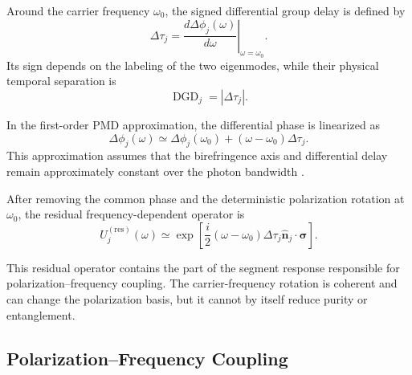 Around the carrier frequency \(\omega_0\), the signed differential group
delay is defined by
%
\begin{equation}
    \Delta\tau_j
    =
    \left.
    \frac{d\Delta\phi_j(\omega)}
    {d\omega}
    \right|_{\omega=\omega_0}.
    \label{eq:single_segment_signed_differential_group_delay}
\end{equation}
%
Its sign depends on the labeling of the two eigenmodes, while their physical
temporal separation is
%
\begin{equation}
    \operatorname{DGD}_j
    =
    |\Delta\tau_j|.
    \label{eq:single_segment_dgd}
\end{equation}

In the first-order PMD approximation, the differential phase is linearized
as
%
\begin{equation}
    \Delta\phi_j(\omega)
    \simeq
    \Delta\phi_j(\omega_0)
    +
    (\omega-\omega_0)\Delta\tau_j.
    \label{eq:single_segment_phase_linearization}
\end{equation}
%
This approximation assumes that the birefringence axis and differential
delay remain approximately constant over the photon bandwidth
\cite{gordon_kogelnik_pmd_2000}.

After removing the common phase and the deterministic polarization rotation
at \(\omega_0\), the residual frequency-dependent operator is
%
\begin{equation}
    U_j^{(\mathrm{res})}(\omega)
    \simeq
    \exp
    \left[
        \frac{i}{2}
        (\omega-\omega_0)
        \Delta\tau_j
        \widehat{\mathbf n}_j
        \cdot
        \boldsymbol{\sigma}
    \right].
    \label{eq:single_segment_residual_operator}
\end{equation}

This residual operator contains the part of the segment response responsible
for polarization--frequency coupling. The carrier-frequency rotation is
coherent and can change the polarization basis, but it cannot by itself
reduce purity or entanglement.


\subsection{Polarization--Frequency Coupling}
\label{subsec:single_segment_polarization_frequency_coupling}

